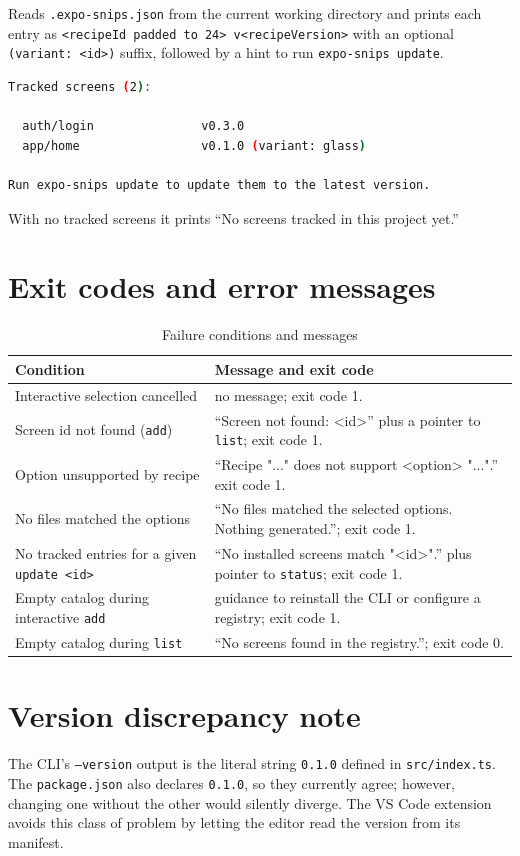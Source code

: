 Reads \texttt{.expo-snips.json} from the current working directory and prints each
entry as \texttt{<recipeId padded to 24> v<recipeVersion>} with an optional
\texttt{(variant: <id>)} suffix, followed by a hint to run
\texttt{expo-snips update}.

\begin{lstlisting}[language=bash]
Tracked screens (2):

  auth/login               v0.3.0
  app/home                 v0.1.0 (variant: glass)

Run expo-snips update to update them to the latest version.
\end{lstlisting}

With no tracked screens it prints ``No screens tracked in this project yet.''

\section{Exit codes and error messages}

\begin{longtable}{p{4.4cm}p{9.6cm}}
\caption{Failure conditions and messages}\\
\toprule
\textbf{Condition} & \textbf{Message and exit code} \\
\midrule

Interactive selection cancelled & no message; exit code 1. \\
Screen id not found (\texttt{add}) & ``Screen not found: <id>'' plus a pointer to
\texttt{list}; exit code 1. \\
Option unsupported by recipe & ``Recipe "..." does not support <option> "...".''
exit code 1. \\
No files matched the options & ``No files matched the selected options. Nothing
generated.''; exit code 1. \\
No tracked entries for a given \texttt{update <id>} & ``No installed screens match
"<id>".'' plus pointer to \texttt{status}; exit code 1. \\
Empty catalog during interactive \texttt{add} & guidance to reinstall the CLI or
configure a registry; exit code 1. \\
Empty catalog during \texttt{list} & ``No screens found in the registry.''; exit code 0. \\
\bottomrule
\end{longtable}

\label{sec:list-empty}

\section{Version discrepancy note}

The CLI's \texttt{--version} output is the literal string \texttt{0.1.0} defined in
\texttt{src/index.ts}. The \texttt{package.json} also declares \texttt{0.1.0}, so
they currently agree; however, changing one without the other would silently
diverge. The VS Code extension avoids this class of problem by letting the editor
read the version from its manifest.

